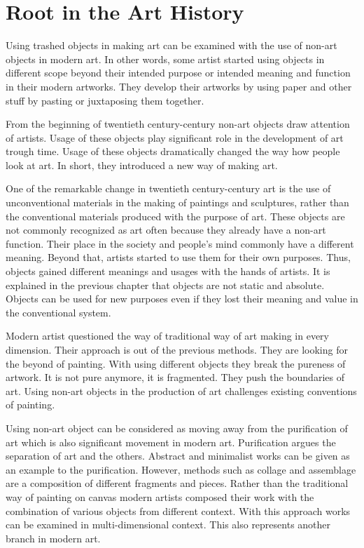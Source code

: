 \section{Root in the Art History}
Using trashed objects in making art can be examined with the use of non-art objects in modern art. In other words, some artist started using objects in different scope beyond their intended purpose or intended meaning and function in their modern artworks. They develop their artworks by using paper and other stuff by pasting or juxtaposing them together.

From the beginning of twentieth century-century non-art objects draw attention of artists. Usage of these objects play significant role in the development of art trough time. Usage of these objects dramatically changed the way how people look at art. In short, they introduced a new way of making art.

One of the remarkable change in twentieth century-century art is the use of unconventional materials in the making of paintings and sculptures, rather than the conventional materials produced with the purpose of art. These objects are not commonly recognized as art often because they already have a non-art function. Their place in the society and people’s mind commonly have a different meaning. Beyond that, artists started to use them for their own purposes. Thus, objects gained different meanings and usages with the hands of artists. It is explained in the previous chapter that objects are not static and absolute. Objects can be used for new purposes even if they lost their meaning and value in the conventional system.

Modern artist questioned the way of traditional way of art making in every dimension. Their approach is out of the previous methods. They are looking for the beyond of painting. With using different objects they break the pureness of artwork. It is not pure anymore, it is fragmented. They push the boundaries of art. Using non-art objects in the production of art challenges existing conventions of painting.

Using non-art object can be considered as moving away from the purification of art which is also significant movement in modern art. Purification argues the separation of art and the others. Abstract and minimalist works can be given as an example to the purification. However, methods such as collage and assemblage are a composition of different fragments and pieces. Rather than the traditional way of painting on canvas modern artists composed their work with the combination of various objects from different context. With this approach works can be examined in multi-dimensional context. This also represents another branch in modern art.


